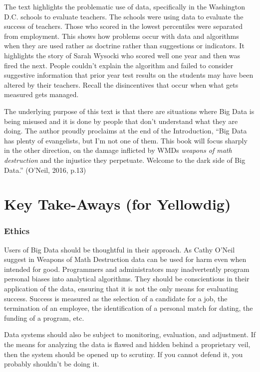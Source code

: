 \documentclass[]{book}
\begin{document}
The text highlights the problematic use of data, specifically in the Washington D.C. schools to evaluate teachers. The schools were using data to evaluate the success of teachers. Those who scored in the lowest percentiles were separated from employment. This shows how problems occur with data and algorithms when they are used rather as doctrine rather than suggestions or indicators. It highlights the story of Sarah Wysocki who scored well one year and then was fired the next. People couldn't explain the algorithm and failed to consider suggestive information that prior year test results on the students may have been altered by their teachers. Recall the disincentives that occur when what gets measured gets managed.

The underlying purpose of this text is that there are situations where Big Data is being misused and it is done by people that don't understand what they are doing. The author proudly proclaims at the end of the Introduction, ``Big Data has plenty of evangelists, but I'm not one of them. This book will focus sharply in the other direction, on the damage inflicted by WMDs \emph{weapons of math destruction} and the injustice they perpetuate. Welcome to the dark side of Big Data.'' (O'Neil, 2016, p.13)

\hypertarget{key-take-aways-for-yellowdig-3}{%
\section{Key Take-Aways (for Yellowdig)}\label{key-take-aways-for-yellowdig-3}}

\hypertarget{ethics}{%
\subsubsection{Ethics}\label{ethics}}

Users of Big Data should be thoughtful in their approach. As Cathy O'Neil suggest in Weapons of Math Destruction data can be used for harm even when intended for good. Programmers and administrators may inadvertently program personal biases into analytical algorithms. They should be conscientious in their application of the data, ensuring that it is not the only means for evaluating success. Success is measured as the selection of a candidate for a job, the termination of an employee, the identification of a personal match for dating, the funding of a program, etc.

Data systems should also be subject to monitoring, evaluation, and adjustment. If the means for analyzing the data is flawed and hidden behind a proprietary veil, then the system should be opened up to scrutiny. If you cannot defend it, you probably shouldn't be doing it.
\end{document}
